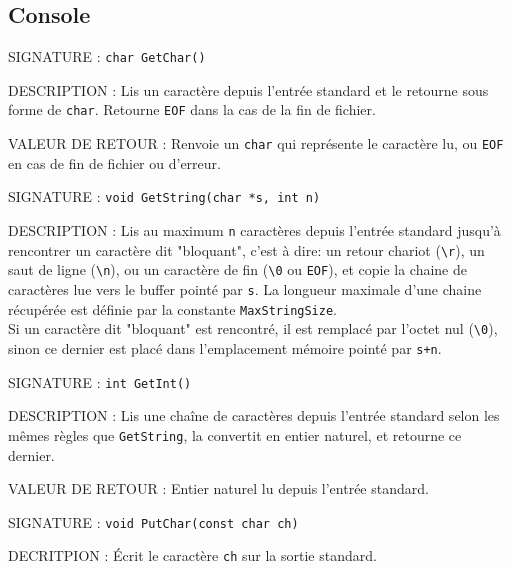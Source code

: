 \documentclass{article}
\begin{document}
	\subsection{Console}
	\begin{description}
		\item{SIGNATURE : } \texttt{char GetChar()}
		\item{DESCRIPTION :}{ Lis un caractère depuis l'entrée standard et le retourne sous forme de \texttt{char}. Retourne \texttt{EOF} dans la cas de la fin de fichier.}
		\item{VALEUR DE RETOUR : } Renvoie un \texttt{char} qui représente le caractère lu, ou \texttt{EOF} en cas de fin de fichier ou d'erreur.
	\end{description}
	\vspace{2.5mm}
	\begin{description}
		\item{SIGNATURE : } \texttt{void GetString(char *s, int n)}
		\item{DESCRIPTION : } Lis au maximum \texttt{n} caractères depuis l'entrée standard jusqu'à rencontrer un caractère dit "bloquant", c'est à dire: un retour chariot (\texttt{\textbackslash{}r}), un saut de ligne (\texttt{\textbackslash{}n}), ou un caractère de fin (\texttt{\textbackslash{}0} ou \texttt{EOF}), et copie la chaine de caractères lue vers le buffer pointé par \texttt{s}. La longueur maximale d'une chaine récupérée est définie par la constante \texttt{MaxStringSize}. \\Si un caractère dit "bloquant" est rencontré, il est remplacé par l'octet nul (\texttt{\textbackslash{}0}), sinon ce dernier est placé dans l'emplacement mémoire pointé par \texttt{s+n}.
	\end{description}
	\vspace{2.5mm}
	\begin{description}
		\item{SIGNATURE : } \texttt{int GetInt()}
		\item{DESCRIPTION : } Lis une chaîne de caractères depuis l'entrée standard selon les mêmes règles que \texttt{GetString}, la convertit en entier naturel, et retourne ce dernier.
		\item{VALEUR DE RETOUR : } Entier naturel lu depuis l'entrée standard.
	\end{description}
	\vspace{2.5mm}
	\begin{description}
		\item{SIGNATURE : } \texttt{void PutChar(const char ch)}
		\item{DECRITPION : } Écrit le caractère \texttt{ch} sur la sortie standard. 
	\end{description}
\end{document}
